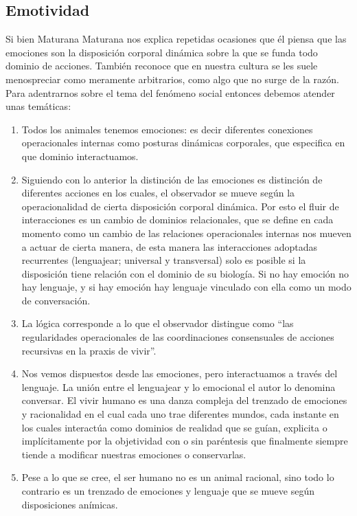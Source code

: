 \documentclass[10pt]{article}
\begin{document}
        \subsection{Emotividad}

        Si bien Maturana Maturana nos explica repetidas ocasiones que él piensa que las emociones son la disposición corporal dinámica sobre la que se funda todo dominio de acciones. También reconoce que en nuestra cultura se les suele menospreciar como meramente arbitrarios, como algo que no surge de la razón. Para adentrarnos sobre el tema del fenómeno social entonces debemos atender unas temáticas:
        
        \begin{enumerate}
            \item Todos los animales tenemos emociones: es decir diferentes conexiones operacionales internas como posturas dinámicas corporales, que especifica en que dominio interactuamos.
            \item Siguiendo con lo anterior la distinción de las emociones es distinción de diferentes acciones en los cuales, el observador se mueve según la operacionalidad de cierta disposición corporal dinámica. Por esto el fluir de interacciones es un cambio de dominios relacionales, que se define en cada momento como un cambio de las relaciones operacionales internas nos mueven a actuar de cierta manera, de esta manera las interacciones adoptadas recurrentes (lenguajear; universal y transversal) solo es posible si la disposición tiene relación con el dominio de su biología. Si no hay emoción no hay lenguaje, y si hay emoción hay lenguaje vinculado con ella como un modo de conversación.
            \item La lógica corresponde a lo que el observador distingue como “las regularidades operacionales de las coordinaciones consensuales de acciones recursivas en la praxis de vivir”.
            \item Nos vemos dispuestos desde las emociones, pero interactuamos a través del lenguaje. La unión entre el lenguajear y lo emocional el autor lo denomina conversar. El vivir humano es una danza compleja del trenzado de emociones y racionalidad en el cual cada uno trae diferentes mundos, cada instante en los cuales interactúa como dominios de realidad que se guían, explicita o implícitamente por la objetividad con o sin paréntesis que finalmente siempre tiende a modificar nuestras emociones o conservarlas.
            \item Pese a lo que se cree, el ser humano no es un animal racional, sino todo lo contrario es un trenzado de emociones y lenguaje que se mueve según disposiciones anímicas.
        
        \end{enumerate}
\end{document}

